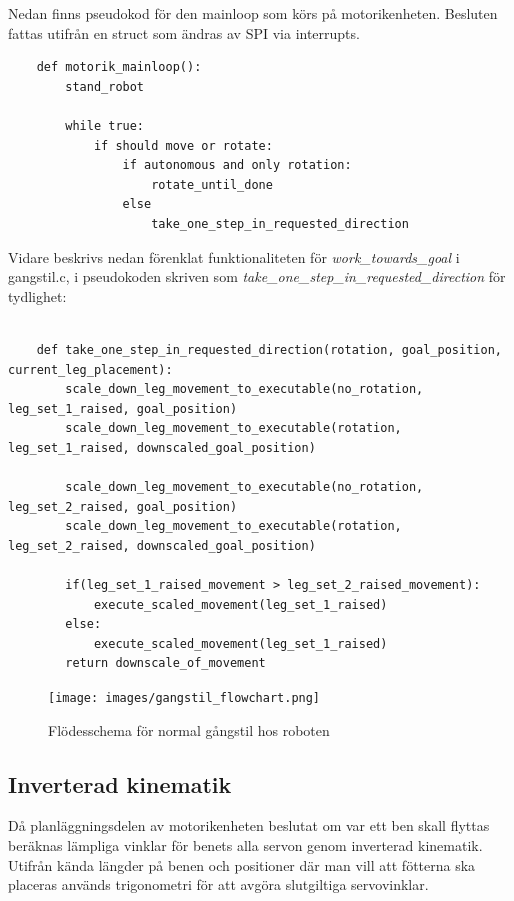 \documentclass[a4paper,titlepage,12pt]{article}
\begin{document}
    	Nedan finns pseudokod för den mainloop som körs på motorikenheten. Besluten fattas utifrån en 
	struct som ändras av SPI via interrupts.

	\begin{lstlisting}
	def motorik_mainloop():
        stand_robot

        while true:
            if should move or rotate:
                if autonomous and only rotation:
                    rotate_until_done
                else
                    take_one_step_in_requested_direction
	\end{lstlisting}
	
    Vidare beskrivs nedan förenklat funktionaliteten för
    \textit{work\_towards\_goal} i gangstil.c, i pseudokoden skriven 
    som \textit{take\_one\_step\_in\_requested\_direction} för tydlighet:

	\begin{lstlisting}
	
	def take_one_step_in_requested_direction(rotation, goal_position, current_leg_placement):
		scale_down_leg_movement_to_executable(no_rotation, leg_set_1_raised, goal_position)
		scale_down_leg_movement_to_executable(rotation, leg_set_1_raised, downscaled_goal_position)

		scale_down_leg_movement_to_executable(no_rotation, leg_set_2_raised, goal_position)
		scale_down_leg_movement_to_executable(rotation, leg_set_2_raised, downscaled_goal_position)

		if(leg_set_1_raised_movement > leg_set_2_raised_movement):
			execute_scaled_movement(leg_set_1_raised)
		else:
			execute_scaled_movement(leg_set_1_raised)
		return downscale_of_movement
	\end{lstlisting}

	\begin{figure}[h]
		\centering
		\texttt{[image: images/gangstil\_flowchart.png]}
		\caption{Flödesschema för normal gångstil hos roboten
        \label{fig:walkflow0}}
	\end{figure}

	\subsection{Inverterad kinematik}
	\label{sub:inverterad-kinematik}
	Då planläggningsdelen av motorikenheten beslutat om var ett ben skall flyttas beräknas 
	lämpliga vinklar för benets alla servon genom inverterad kinematik. Utifrån kända 
	längder på benen och positioner där man vill att fötterna ska placeras används 
	trigonometri för att avgöra slutgiltiga servovinklar.
	
\end{document}
